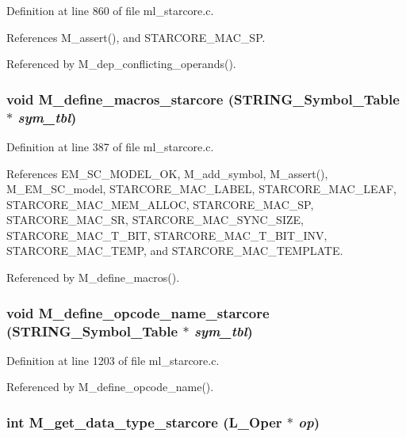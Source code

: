 Definition at line 860 of file ml\_\-starcore.c.

References M\_\-assert(), and STARCORE\_\-MAC\_\-SP.

Referenced by M\_\-dep\_\-conflicting\_\-operands().
\subsubsection{\setlength{\rightskip}{0pt plus 5cm}void M\_\-define\_\-macros\_\-starcore (\bf{STRING\_\-Symbol\_\-Table} $\ast$ {\em sym\_\-tbl})}\label{m__starcore_8h_4895c301138a37502983278f49cd635b}




Definition at line 387 of file ml\_\-starcore.c.

References EM\_\-SC\_\-MODEL\_\-OK, M\_\-add\_\-symbol, M\_\-assert(), M\_\-EM\_\-SC\_\-model, STARCORE\_\-MAC\_\-LABEL, STARCORE\_\-MAC\_\-LEAF, STARCORE\_\-MAC\_\-MEM\_\-ALLOC, STARCORE\_\-MAC\_\-SP, STARCORE\_\-MAC\_\-SR, STARCORE\_\-MAC\_\-SYNC\_\-SIZE, STARCORE\_\-MAC\_\-T\_\-BIT, STARCORE\_\-MAC\_\-T\_\-BIT\_\-INV, STARCORE\_\-MAC\_\-TEMP, and STARCORE\_\-MAC\_\-TEMPLATE.

Referenced by M\_\-define\_\-macros().
\subsubsection{\setlength{\rightskip}{0pt plus 5cm}void M\_\-define\_\-opcode\_\-name\_\-starcore (\bf{STRING\_\-Symbol\_\-Table} $\ast$ {\em sym\_\-tbl})}\label{m__starcore_8h_9bb5d965e6782eb55395f7349eaebd1e}




Definition at line 1203 of file ml\_\-starcore.c.

Referenced by M\_\-define\_\-opcode\_\-name().
\subsubsection{\setlength{\rightskip}{0pt plus 5cm}int M\_\-get\_\-data\_\-type\_\-starcore (L\_\-Oper $\ast$ {\em op})}\label{m__starcore_8h_fc2438aed4ed8dd088101be27cea86da}





